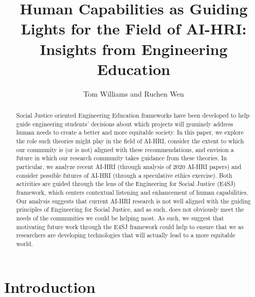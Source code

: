 \documentclass[letterpaper]{article} %
\title{Human Capabilities as Guiding Lights for the Field of AI-HRI:\\ Insights from Engineering Education}
\author {
    Tom Williams and Ruchen Wen\\
}
\begin{document}
\maketitle

\begin{abstract}
Social Justice oriented Engineering Education frameworks have been developed to help guide engineering students' decisions about which projects will genuinely address human needs to create a better and more equitable society. 
In this paper, we explore the role such theories might play in the field of AI-HRI, 
consider the extent to which our community is (or is not) aligned with these recommendations, and envision a future in which our research community takes guidance from these
theories. In particular, we analyze recent AI-HRI (through analysis of 2020 AI-HRI papers) and consider possible  futures of AI-HRI (through a speculative ethics exercise). Both activities are guided through the lens of the Engineering for Social Justice (E4SJ) framework, which centers contextual listening and enhancement of human capabilities. Our analysis suggests that current AI-HRI research is not well aligned with the  guiding principles of Engineering for Social Justice, and as such, does not obviously meet the needs of the communities we could be helping most. As such, we suggest that motivating future work through the E4SJ framework could help to ensure that we as researchers are developing technologies that will actually lead to a more equitable world.
\end{abstract}

\section{Introduction}
\end{document}
